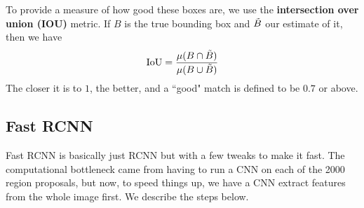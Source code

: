 \documentclass{article}
\begin{document}
    \begin{definition}[IOU]
    To provide a measure of how good these boxes are, we use the \textbf{intersection over union (IOU)} metric. If $B$ is the true bounding box and $\Tilde{B}$ our estimate of it, then we have 
    \[\mathrm{IoU} = \frac{\mu(B \cap \Tilde{B})}{\mu(B \cup \Tilde{B})}\]
    The closer it is to $1$, the better, and a ``good" match is defined to be $0.7$ or above.  
    \end{definition} 

  \subsection{Fast RCNN}

    Fast RCNN is basically just RCNN but with a few tweaks to make it fast. The computational bottleneck came from having to run a CNN on each of the 2000 region proposals, but now, to speed things up, we have a CNN extract features from the whole image first. We describe the steps below. 
\end{document}
